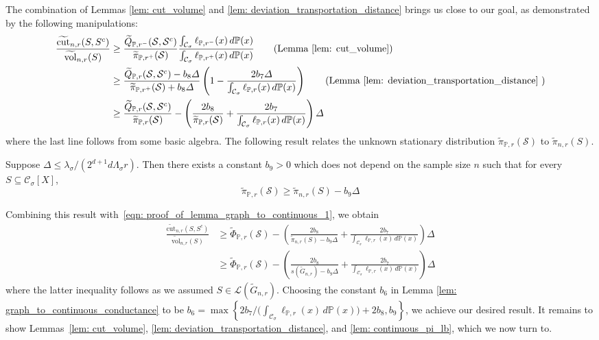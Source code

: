 \documentclass[11pt,twoside]{article}
\newcommand{\set}[1]{\left\{#1\right\}}
\newcommand{\vol}{\mathrm{vol}}
\newcommand{\cut}{\mathrm{cut}}
\newcommand{\1}{\mathbbm{1}}
\newcommand{\Xbf}{X}
\newcommand{\Pbb}{\mathbb{P}}
\newcommand{\Sset}{\mathcal{S}}
\newcommand{\Cset}{\mathcal{C}}
\newcommand{\Csig}{\Cset_{\sigma}}
\begin{document}
The combination of Lemmas \ref{lem: cut_volume} and \ref{lem: deviation_transportation_distance} brings us close to our goal, as demonstrated by the following manipulations:
\begin{align}
\frac{\widetilde{\cut}_{n,r}(S,S^c)}{\widetilde{\vol}_{n,r}(S)} & \geq \frac{\widetilde{Q}_{\Pbb,r^-}(\Sset,\Sset^c)}{\widetilde{\pi}_{\Pbb,r^+}(\Sset)} \frac{\int_{\Csig} \ell_{\Pbb,r^-}(x) \,d\Pbb(x)}{\int_{\Csig} \ell_{\Pbb,r^+}(x) \,d\Pbb(x)} \tag{Lemma \ref{lem: cut_volume}} \\
& \geq \frac{\widetilde{Q}_{\Pbb,r}(\Sset,\Sset^c) - b_8 \varDelta }{\widetilde{\pi}_{\Pbb,r^+}(\Sset) + b_8 \varDelta} \left(1 - \frac{2 b_7 \varDelta}{\int_{\Csig}\ell_{\Pbb,r}(x)\,d\Pbb(x)}\right) \tag{Lemma \ref{lem: deviation_transportation_distance} } \\
& \geq \frac{\widetilde{Q}_{\Pbb,r}(\Sset,\Sset^c)}{\widetilde{\pi}_{\Pbb,r}(\Sset)} - \left(\frac{2b_8}{\widetilde{\pi}_{\Pbb,r}(\Sset)} + \frac{2b_7}{\int_{\Csig}\ell_{\Pbb,r}(x)\,d\Pbb(x)}\right)\varDelta \label{eqn: proof_of_lemma_graph_to_continuous_1}
\end{align}
where the last line follows from some basic algebra. The following result relates the unknown stationary distribution $\widetilde{\pi}_{\Pbb,r}(\Sset)$ to $\widetilde{\pi}_{n,r}(S)$.
\begin{lemma}
	\label{lem: continuous_pi_lb}
	Suppose $\varDelta \leq \lambda_{\sigma}/(2^{d+1}d\Lambda_{\sigma}r)$. Then there exists a constant $b_9 > 0$ which does not depend on the sample size $n$ such that for every $S \subseteq \Csig[\Xbf]$,
	\begin{equation*}
	\widetilde{\pi}_{\Pbb,r}(\Sset) \geq \widetilde{\pi}_{n,r}(S) - b_9 \varDelta
	\end{equation*}
\end{lemma}
Combining this result with~\eqref{eqn: proof_of_lemma_graph_to_continuous_1}, we obtain
\begin{align*}
\frac{\widetilde{\cut}_{n,r}(S,S^c)}{\widetilde{\vol}_{n,r}(S)} & \geq \widetilde{\Phi}_{\Pbb,r}(\Sset) - \left(\frac{2b_8}{\widetilde{\pi}_{n,r}(S) - b_9\varDelta} + \frac{2b_7}{\int_{\Csig}\ell_{\Pbb,r}(x)\,d\Pbb(x)}\right)\varDelta \\
& \geq \widetilde{\Phi}_{\Pbb,r}(\Sset) - \left(\frac{2b_8}{s(\widetilde{G}_{n,r}) - b_9\varDelta} + \frac{2b_7}{\int_{\Csig}\ell_{\Pbb,r}(x)\,d\Pbb(x)}\right)\varDelta
\end{align*}
where the latter inequality follows as we assumed $S \in \mathcal{L}(\widetilde{G}_{n,r})$. Choosing the constant $b_6$ in Lemma \ref{lem: graph_to_continuous_conductance} to be $b_6 = \max\set{2b_7/\bigl(\int_{\Csig}\ell_{\Pbb,r}(x)\,d\Pbb(x) \bigr) + 2b_8, b_9}$, we achieve our desired result. It remains to show Lemmas~\ref{lem: cut_volume}, \ref{lem: deviation_transportation_distance}, and \ref{lem: continuous_pi_lb}, which we now turn to.
\end{document}
